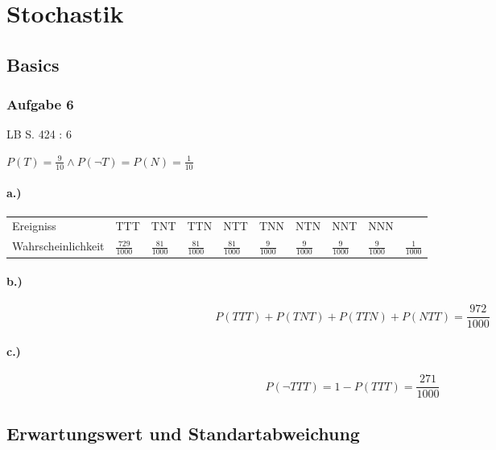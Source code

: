 \documentclass{article}
\begin{document}
\section*{Stochastik}

\subsection*{Basics}

\subsubsection*{Aufgabe 6}
LB S. 424 : 6

\( P(T) = \frac{9}{10} \wedge P(\neg T) = P(N) = \frac{1}{10} \)

\paragraph*{a.)}

\begin{tabular}{ |p{2.7cm}|p{1.3cm}|p{1.3cm}|p{1.3cm}|p{1.3cm}|p{1.3cm}|p{1.3cm}|p{1.3cm}|p{1.5cm}|p{1.5cm}|  }
 \hline
	Ereigniss & TTT & TNT & TTN & NTT & TNN & NTN & NNT & NNN \\
	Wahrscheinlichkeit & \(\frac{729}{1000}\) & \(\frac{81}{1000}\)  & \(\frac{81}{1000}\) & \(\frac{81}{1000}\) & \(\frac{9}{1000}\) &  \(\frac{9}{1000}\) &  \(\frac{9}{1000}\) &  \(\frac{9}{1000}\) &  \(\frac{1}{1000}\)\\
 
 \hline
\end{tabular}

\paragraph*{b.)}

\begin{equation}
	P(TTT) + P(TNT) + P(TTN) + P(NTT) = \frac{972}{1000}
\end{equation}

\paragraph*{c.)}

\begin{equation}
	P(\neg TTT) = 1 - P(TTT) = \frac{271}{1000}
\end{equation}

\subsection*{Erwartungswert und Standartabweichung}
\end{document}
